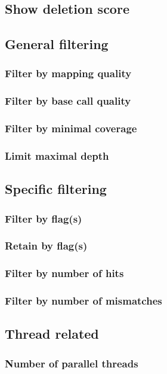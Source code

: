 \documentclass[10pt,a4paper]{article}
\begin{document}
\subsection{Show deletion score}

\subsection{General filtering}
\subsubsection{Filter by mapping quality}

\subsubsection{Filter by base call quality}

\subsubsection{Filter by minimal coverage}

\subsubsection{Limit maximal depth}

\subsection{Specific filtering}
\subsubsection{Filter by flag(s)}
\subsubsection{Retain by flag(s)}

\subsubsection{Filter by number of hits}

\subsubsection{Filter by number of mismatches}

% 
\subsection{Thread related}
\subsubsection{Number of parallel threads}

\end{document}
